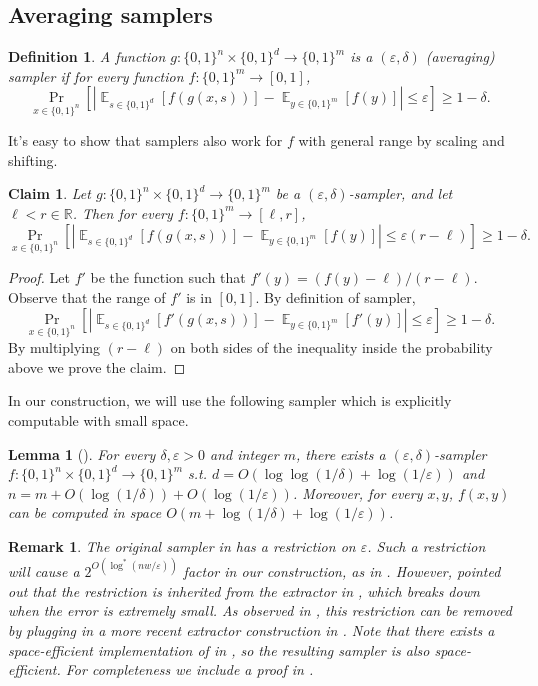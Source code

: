 \documentclass[10pt,a4paper]{article}
\newtheorem{definition}[theorem]{Definition}
\newtheorem{lemma}[theorem]{Lemma}
\newtheorem{claim}[theorem]{Claim}
\newtheorem{remark}[theorem]{Remark}
\DeclareMathOperator*{\Ex}{\mathbb E}
\newcommand{\ex}[2][]{\Ex_{#1}\left[#2\right]}
\newcommand{\pr}[2][]{\Pr_{#1}\left[#2\right]}
\newcommand{\abs}[1]{\left|#1\right|}
\newcommand{\bbR}{\mathbb R}
\newcommand{\bits}[1]{\{0,1\}^{#1}}
\newcommand{\eps}{\varepsilon}
\begin{document}
\subsection{Averaging samplers}
\begin{definition}
A function $g:\bits{n}\times\bits{d}\to\bits{m}$ is a \emph{$(\eps,\delta)$ (averaging) sampler} if for every function $f:\bits{m}\to{[0,1]}$, 
$$\pr[x\in\bits{n}]{\abs{\ex[s\in\bits{d}]{f(g(x,s))}-\ex[y\in\bits{m}]{f(y)}}\le\eps}\ge 1-\delta.$$
\end{definition}
\noindent
It's easy to show that samplers also work for $f$ with general range by scaling and shifting.
\begin{claim}\label{lemma:sampler-general}
Let $g:\bits{n}\times\bits{d}\to\bits{m}$ be a $(\eps,\delta)$-sampler, and let $\ell<r\in\bbR$. Then for every $f:\bits{m}\to{[\ell,r]}$, 
$$\pr[x\in\bits{n}]{\abs{\ex[s\in\bits{d}]{f(g(x,s))}-\ex[y\in\bits{m}]{f(y)}}\le\eps(r-\ell)}\ge 1-\delta.$$
\end{claim}
\begin{proof}
Let $f'$ be the function such that $f'(y)=(f(y)-\ell)/(r-\ell)$. Observe that the range of $f'$ is in $[0,1]$. By definition of sampler, 
$$\pr[x\in\bits{n}]{\abs{\ex[s\in\bits{d}]{f'(g(x,s))}-\ex[y\in\bits{m}]{f'(y)}}\le\eps}\ge 1-\delta.$$
By multiplying $(r-\ell)$ on both sides of the inequality inside the probability above we prove the claim.
\end{proof}
In our construction, we will use the following sampler which is explicitly computable with small space.
\begin{lemma}[\cite{RVW01,Gol11}]\label{lemma:samp-opt}
For every $\delta,\eps>0$ and integer $m$, there exists a $(\eps,\delta)$-sampler $f:\bits{n}\times\bits{d}\to\bits{m}$ s.t. $d=O(\log\log(1/\delta)+\log(1/\eps))$ and $n=m+O(\log(1/\delta))+O(\log(1/\eps))$. Moreover, for every $x,y$, $f(x,y)$ can be computed in space $O(m+\log(1/\delta)+\log(1/\eps))$.
\end{lemma}
\begin{remark}
The original sampler in \cite{RVW01} has a restriction on $\eps$. Such a restriction will cause a $2^{O(\log^*(nw/\eps))}$ factor in our construction, as in \cite{BCG18}. However, \cite{RVW01} pointed out that the restriction is inherited from the extractor in \cite{Zuc97}, which breaks down when the error is extremely small. As observed in \cite{Gol11}, this restriction can be removed by plugging in a more recent extractor construction in \cite{GUV09}. Note that there exists a space-efficient implementation of \cite{GUV09} in \cite{KNW08}, so the resulting sampler is also space-efficient. For completeness we include a proof in .
\end{remark}
\end{document}
